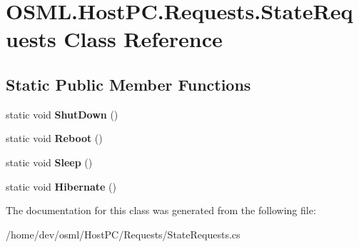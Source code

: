 \hypertarget{classOSML_1_1HostPC_1_1Requests_1_1StateRequests}{}\section{O\+S\+M\+L.\+Host\+P\+C.\+Requests.\+State\+Requests Class Reference}
\label{classOSML_1_1HostPC_1_1Requests_1_1StateRequests}
\subsection*{Static Public Member Functions}
\begin{DoxyCompactItemize}
\item 
\mbox{\label{classOSML_1_1HostPC_1_1Requests_1_1StateRequests_a5136ed38d158954f70d736c9bb6c575d}} 
static void {\bfseries Shut\+Down} ()
\item 
\mbox{\label{classOSML_1_1HostPC_1_1Requests_1_1StateRequests_ae1ee368da44d395ae3b8788cbe7d491f}} 
static void {\bfseries Reboot} ()
\item 
\mbox{\label{classOSML_1_1HostPC_1_1Requests_1_1StateRequests_a96cce5b9d95bd6c4eb6e4e80728e0873}} 
static void {\bfseries Sleep} ()
\item 
\mbox{\label{classOSML_1_1HostPC_1_1Requests_1_1StateRequests_a707b21363a2d1aa68ab7a17a31bed533}} 
static void {\bfseries Hibernate} ()
\end{DoxyCompactItemize}


The documentation for this class was generated from the following file\+:\begin{DoxyCompactItemize}
\item 
/home/dev/osml/\+Host\+P\+C/\+Requests/State\+Requests.\+cs\end{DoxyCompactItemize}
